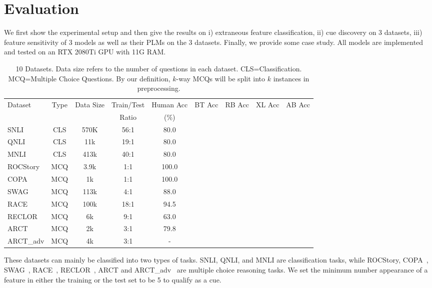 \section{Evaluation}
\label{sec:eval}
We first show the experimental setup and then give the results on
i) extraneous feature classification,
ii) cue discovery on 3 datasets,
iii) feature sensitivity of 3 models as well as their PLMs on the 3 datasets.
Finally, we provide some case study. 
All models are implemented and tested on an RTX 2080Ti GPU with 11G RAM.

\begin{table*}[!th]
\scriptsize
\centering
\begin{tabular}{lcccccccc}\hline
Dataset & Type & Data Size & Train/Test & Human Acc & BT Acc & RB Acc & XL Acc & AB Acc \\ 
 	&	&	& Ratio	& (\%) \\ \hline
SNLI     &CLS   &  570K     & 56:1               &80.0\\
QNLI     &CLS    & 11k         &  19:1           &80.0\\
MNLI     &CLS     & 413k       &  40:1             &80.0\\
ROCStory & MCQ & 3.9k         & 1:1            &100.0  \\
COPA     &MCQ    & 1k           &  1:1         & 100.0     \\
SWAG     &MCQ   & 113k       &  4:1             & 88.0\\
RACE     & MCQ   & 100k      &  18:1              &94.5\\
RECLOR   &MCQ    &  6k          &  9:1           &63.0\\
ARCT     &MCQ    & 2k         & 3:1                &79.8\\
ARCT\_adv& MCQ & 4k         & 3:1                 & -\\
\hline
\end{tabular}
\caption{10 Datasets. Data size refers to the number of questions
in each dataset. CLS=Classification. MCQ=Multiple Choice Questions. 
By our definition, $k$-way MCQs will be split into $k$ instances 
in preprocessing.}\label{tab:datasets} 
\end{table*}

These datasets can mainly be classified into two types of tasks. 
SNLI, QNLI, and MNLI are classification tasks, while 
ROCStory, COPA~\cite{roemmele2011choice}, SWAG~\cite{zellers2018swag}, 
RACE~\cite{lai2017race}, 
RECLOR~\cite{yu2020reclor}, %
ARCT and ARCT\_adv~\cite{schuster2019towards} are
multiple choice reasoning tasks. 
We set the minimum number appearance of a feature
in either the training or the test set to be 5 to qualify as a cue.

